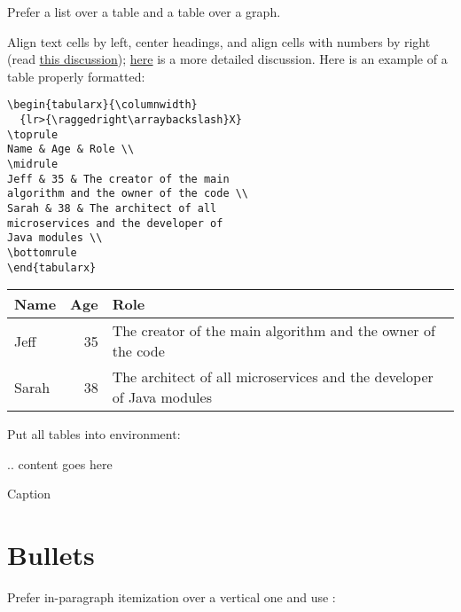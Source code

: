 \documentclass[12pt,nonacm,natbib=false]{acmart}
\begin{document}
Prefer a list over a table and a table over a graph.

Align text cells by left, center headings, and align cells with numbers by right (read \href{https://latex.org/forum/viewtopic.php?t=24435}{this discussion}); \href{https://ux.stackexchange.com/questions/24066/what-is-the-best-practice-for-data-table-cell-content-alignment}{here} is a more detailed discussion. Here is an example of a table properly formatted:

\begin{multicols}{2}
\setlength{\parskip}{0pt}
\small
\raggedcolumns
\begin{verbatim}
\begin{tabularx}{\columnwidth}
  {lr>{\raggedright\arraybackslash}X}
\toprule
Name & Age & Role \\
\midrule
Jeff & 35 & The creator of the main
algorithm and the owner of the code \\
Sarah & 38 & The architect of all
microservices and the developer of
Java modules \\
\bottomrule
\end{tabularx}
\end{verbatim}

\columnbreak

\begin{tabularx}{\columnwidth}
  {lr>{\raggedright\arraybackslash}X}
\toprule
Name & Age & Role \\
\midrule
Jeff & 35 & The creator of the main algorithm and the owner of the code \\
Sarah & 38 & The architect of all microservices and the developer of Java modules \\
\bottomrule
\end{tabularx}
\end{multicols}

Put all tables into  environment:

\begin{ffcode}
\begin{table}
.. content goes here
\caption{Caption}
\label{tab:my-table}
\end{table}
\end{ffcode}


\section{Bullets}

Prefer in-paragraph itemization over a vertical one and use \href{https://ctan.org/pkg/paralist}{}:
\end{document}
